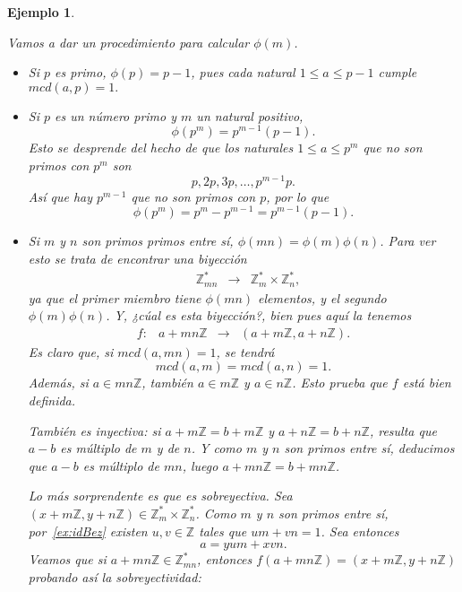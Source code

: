 \documentclass[12pt]{article}
\newtheorem{example}{Ejemplo}[theorem]
\begin{document}
\begin{example}
\begin{enumerate}
Vamos a dar un procedimiento para calcular $\phi(m)$.

\begin{itemize}
\item Si $p$ es primo, $\phi(p) = p-1$, pues cada natural $1 \leq a \leq p-1$ cumple $mcd(a,p)=1.$
\item Si $p$ es un número primo y $m$ un natural positivo, $$\phi(p^{m})= p^{m-1}(p-1).$$ Esto se desprende del hecho de que los naturales $1 \leq a \leq p^{m}$ que no son primos con $p^{m}$ son $$p, 2p, 3p, \ldots, p^{m-1}p.$$ Así que hay $p^{m-1}$ que no son primos con $p$, por lo que $$\phi(p^{m}) = p^{m}-p^{m-1} = p^{m-1}(p-1).$$
\item Si $m$ y $n$ son primos primos entre sí, $\phi(mn)= \phi(m) \phi(n)$. Para ver esto se trata de encontrar una biyección 
$$\begin{array}{rccl}
&\mathbb{Z}_{mn}^{\ast} & \longrightarrow &\mathbb{Z}_{m}^{\ast} \times \mathbb{Z}_{n}^{\ast},
\end{array}
$$ 
ya que el primer miembro tiene $\phi(mn)$ elementos, y el segundo $\phi(m)\phi(n)$. Y, ¿cúal es esta biyección?, bien pues aquí la tenemos 
$$\begin{array}{rccl}
f \colon &a + mn\mathbb{Z}& \longrightarrow &(a+ m\mathbb{Z}, a + n\mathbb{Z}).
\end{array}
$$ 
Es claro que, si $mcd(a,mn)=1$, se tendrá $$mcd(a,m)= mcd(a,n)=1.$$ Además, si $a \in mn\mathbb{Z}$, también $a \in m\mathbb{Z}$ y $a \in n\mathbb{Z}$. Esto prueba que $f$ está bien definida.

También es inyectiva: si $a + m\mathbb{Z} = b + m\mathbb{Z}$ y $a + n\mathbb{Z} = b + n\mathbb{Z}$, resulta que $a-b$ es múltiplo de $m$ y de $n$. Y como $m$ y $n$ son primos entre sí, deducimos que $a-b$ es múltiplo de $mn$, luego $a + mn\mathbb{Z}= b + mn\mathbb{Z}$.

Lo más sorprendente es que es sobreyectiva. Sea $(x + m\mathbb{Z}, y + n\mathbb{Z}) \in \mathbb{Z}_{m}^{\ast} \times \mathbb{Z}_{n}^{\ast}$. Como $m$ y $n$ son primos entre sí, por~\ref{ex:idBez} existen $u,v \in \mathbb{Z}$ tales que $um + vn = 1$. Sea entonces $$a = yum + xvn.$$
Veamos que si $a + mn\mathbb{Z} \in \mathbb{Z}_{mn}^{\ast}$, entonces $f(a + mn\mathbb{Z}) = (x + m\mathbb{Z}, y + n\mathbb{Z})$ probando así la sobreyectividad:


\end{itemize}
\end{enumerate}
\end{example}
\end{document}
